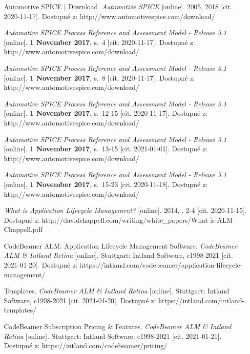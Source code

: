 \documentclass[czech,master]{diploma}
\begin{document}
\begin{thebibliography}{43}
Automotive SPICE | Download. \textit{Automotive SPICE} [online]. 2005, 2018 [cit. 2020-11-17]. Dostupné z: http://www.automotivespice.com/download/

\textit{Automotive SPICE Process Reference and Assessment Model - Release 3.1} [online]. \textbf{1 November 2017}, s.~4 [cit. 2020-11-17]. Dostupné z: http://www.automotivespice.com/download/

\textit{Automotive SPICE Process Reference and Assessment Model - Release 3.1} [online]. \textbf{1 November 2017}, s.~8 [cit. 2020-11-17]. Dostupné z: http://www.automotivespice.com/download/

\textit{Automotive SPICE Process Reference and Assessment Model - Release 3.1} [online]. \textbf{1 November 2017}, s.~12-15 [cit. 2020-11-17]. Dostupné z: http://www.automotivespice.com/download/


\textit{Automotive SPICE Process Reference and Assessment Model - Release 3.1} [online]. \textbf{1 November 2017}, s.~13-15 [cit. 2021-01-01]. Dostupné z: http://www.automotivespice.com/download/

\textit{Automotive SPICE Process Reference and Assessment Model - Release 3.1} [online]. \textbf{1 November 2017}, s.~15-23 [cit. 2020-11-18]. Dostupné z: http://www.automotivespice.com/download/

\textit{What is Application Lifecycle Management?} [online]. 2014, , 2-4 [cit. 2020-11-15]. Dostupné z: http://davidchappell.com/writing/white\_papers/What-is-ALM--Chappell.pdf

CodeBeamer ALM: Application Lifecycle Management Software. \textit{CodeBeamer ALM \& Intland Retina }[online]. Stuttgart: Intland Software, c1998-2021 [cit. 2021-01-20]. Dostupné z: https://intland.com/codebeamer/application-lifecycle-management/

Templates. \textit{CodeBeamer ALM \& Intland Retina} [online]. Stuttgart: Intland Software, c1998-2021 [cit. 2021-01-20]. Dostupné z: https://intland.com/intland-templates/

CodeBeamer Subscription Pricing \& Features. \textit{CodeBeamer ALM \& Intland Retina} [online]. Stuttgart: Intland Software, c1998-2021 [cit. 2021-01-21]. Dostupné z: https://intland.com/codebeamer/pricing/


\end{thebibliography}
\end{document}
